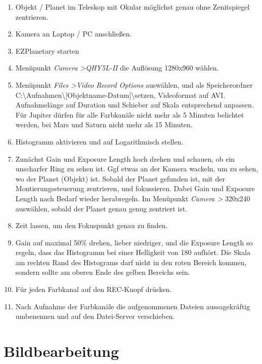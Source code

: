 \documentclass[10pt,a4paper,titlepage]{article}
\begin{document}
\begin{enumerate} 
\item Objekt / Planet im Teleskop mit Okular möglichst genau ohne Zenitspiegel zentrieren.
\item Kamera an Laptop / PC anschließen.
\item EZPlanetary starten
\item Menüpunkt \textit{Camera \textgreater QHY5L-II} die Auflösung 1280x960 wählen.
\item Menüpunkt \textit{Files \textgreater Video Record Options} auswählen, und als Speicherordner C:\textbackslash Aufnahmen\textbackslash [Objektname-Datum]\textbackslash setzen, Videoformat auf AVI. Aufnahmelänge auf Duration und Schieber auf Skala entsprechend anpassen. Für Jupiter dürfen für alle Farbkanäle nicht mehr als 5 Minuten belichtet werden, bei Mars und Saturn nicht mehr als 15 Minuten.
\item Histogramm aktivieren und auf Logarithmisch stellen.
\item Zunächst Gain und Exposure Length hoch drehen und schauen, ob ein unscharfer Ring zu sehen ist. Ggf etwas an der Kamera wackeln, um zu sehen, wo der Planet (Objekt) ist. Sobald der Planet gefunden ist, mit der Montierungssteuerung zentrieren, und fokussieren. Dabei Gain und Exposure Length nach Bedarf wieder herabregeln. Im Menüpunkt \textit{Camera \textgreater} 320x240 auswählen, sobald der Planet genau genug zentriert ist.
\item Zeit lassen, um den Fokuspunkt genau zu finden.
\item Gain auf maximal 50\% drehen, lieber niedriger, und die Exposure Length so regeln, dass das Histogramm bei einer Helligkeit von 180 aufhört. Die Skala am rechten Rand des Histograms darf nicht in den roten Bereich kommen, sondern sollte am oberen Ende des gelben Bereichs sein.
\item Für jeden Farbkanal auf den REC-Knopf drücken.
\item Nach Aufnahme der Farbkanäle die aufgenommenen Dateien aussagekräftig umbenennen und auf den Datei-Server verschieben.
\end{enumerate}
\section{Bildbearbeitung}
\end{document}
